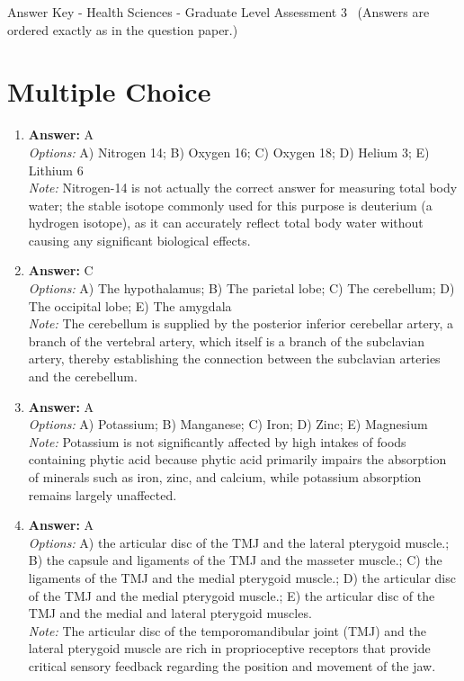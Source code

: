 \documentclass[12pt]{article}
\begin{document}
\begin{center}
Answer Key - Health Sciences - Graduate Level Assessment 3 \
\small (Answers are ordered exactly as in the question paper.)
\end{center}

\section*{Multiple Choice}
\begin{enumerate}[label=\arabic*.]
\item \textbf{Answer:} A
\\ \textit{Options:} A) Nitrogen 14; B) Oxygen 16; C) Oxygen 18; D) Helium 3; E) Lithium 6
\\ \textit{Note:} Nitrogen-14 is not actually the correct answer for measuring total body water; the stable isotope commonly used for this purpose is deuterium (a hydrogen isotope), as it can accurately reflect total body water without causing any significant biological effects.
\item \textbf{Answer:} C
\\ \textit{Options:} A) The hypothalamus; B) The parietal lobe; C) The cerebellum; D) The occipital lobe; E) The amygdala
\\ \textit{Note:} The cerebellum is supplied by the posterior inferior cerebellar artery, a branch of the vertebral artery, which itself is a branch of the subclavian artery, thereby establishing the connection between the subclavian arteries and the cerebellum.
\item \textbf{Answer:} A
\\ \textit{Options:} A) Potassium; B) Manganese; C) Iron; D) Zinc; E) Magnesium
\\ \textit{Note:} Potassium is not significantly affected by high intakes of foods containing phytic acid because phytic acid primarily impairs the absorption of minerals such as iron, zinc, and calcium, while potassium absorption remains largely unaffected.
\item \textbf{Answer:} A
\\ \textit{Options:} A) the articular disc of the TMJ and the lateral pterygoid muscle.; B) the capsule and ligaments of the TMJ and the masseter muscle.; C) the ligaments of the TMJ and the medial pterygoid muscle.; D) the articular disc of the TMJ and the medial pterygoid muscle.; E) the articular disc of the TMJ and the medial and lateral pterygoid muscles.
\\ \textit{Note:} The articular disc of the temporomandibular joint (TMJ) and the lateral pterygoid muscle are rich in proprioceptive receptors that provide critical sensory feedback regarding the position and movement of the jaw.

\end{enumerate}
\end{document}

